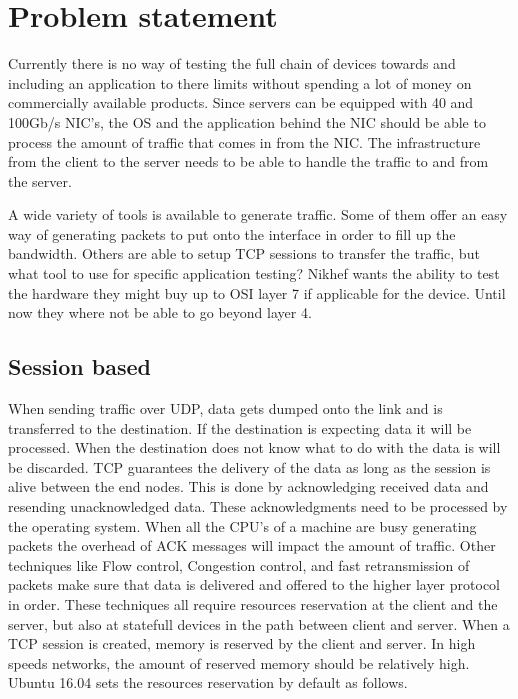 \chapter{Problem statement}\label{ch:problem}
Currently there is no way of testing the full chain of devices towards and including an application to there limits without spending a lot of money on commercially available products. 
Since servers can be equipped with 40 and 100Gb/s NIC's, the OS and the application behind the NIC should be able to process the amount of traffic that comes in from the NIC.
The infrastructure from the client to the server needs to be able to handle the traffic to and from the server.
  
A wide variety of tools is available to generate traffic. Some of them offer an easy way of generating packets to put onto the interface in order to fill up the bandwidth. 
Others are able to setup TCP sessions to transfer the traffic, but what tool to use for specific application testing?   
Nikhef wants the ability to test the hardware they might buy up to OSI layer 7 if applicable for the device. 
Until now they where not be able to go beyond layer 4. 

\section{Session based}\label{sec:sessionbased}
When sending traffic over UDP, data gets dumped onto the link and is transferred to the destination. If the destination is expecting data it will be processed.
When the destination does not know what to do with the data is will be discarded. 
TCP guarantees the delivery of the data as long as the session is alive between the end nodes. 
This is done by acknowledging received data and resending unacknowledged data. These acknowledgments need to be processed by the operating system. 
When all the CPU's of a machine are busy generating packets the overhead of ACK messages will impact the amount of traffic. 
Other techniques like Flow control, Congestion control, and fast retransmission of packets make sure that data is delivered and offered to the higher layer protocol in order. 
These techniques all require resources reservation at the client and the server, but also at statefull devices in the path between client and server. 
When a TCP session is created, memory is reserved by the client and server. In high speeds networks, the amount of reserved memory should be relatively high. 
Ubuntu 16.04 sets the resources reservation by default as follows.

